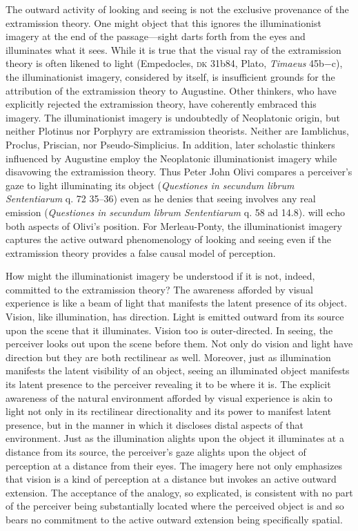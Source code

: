 \documentclass[12pt]{article}
\begin{document}
The outward activity of looking and seeing is not the exclusive provenance of the extramission theory. One might object that this ignores the illuminationist imagery at the end of the passage---sight darts forth from the eyes and illuminates what it sees. While it is true that the visual ray of the extramission theory is often likened to light (Empedocles, \textsc{dk} 31b84, Plato, \emph{Timaeus} 45b−c), the illuminationist imagery, considered by itself, is insufficient grounds for the attribution of the extramission theory to Augustine. Other thinkers, who have explicitly rejected the extramission theory, have coherently embraced this imagery. The illuminationist imagery is undoubtedly of Neoplatonic origin, but neither Plotinus nor Porphyry are extramission theorists. Neither are Iamblichus, Proclus, Priscian, nor Pseudo-Simplicius. In addition, later scholastic thinkers influenced by Augustine employ the Neoplatonic illuminationist imagery while disavowing the extramission theory. Thus Peter John Olivi compares a perceiver's gaze to light illuminating its object (\emph{Questiones in secundum librum Sententiarum} q. 72 35–36) even as he denies that seeing involves any real emission (\emph{Questiones in secundum librum Sententiarum} q. 58 ad 14.8). \citet[185]{Merleau-Ponty:1967fj} will echo both aspects of Olivi's position. For Merleau-Ponty, the illuminationist imagery captures the active outward phenomenology of looking and seeing even if the extramission theory provides a false causal model of perception. 

How might the illuminationist imagery be understood if it is not, indeed, committed to the extramission theory? The awareness afforded by visual experience is like a beam of light that manifests the latent presence of its object. Vision, like illumination, has direction. Light is emitted outward from its source upon the scene that it illuminates. Vision too is outer-directed. In seeing, the perceiver looks out upon the scene before them. Not only do vision and light have direction but they are both rectilinear as well. Moreover, just as illumination manifests the latent visibility of an object, seeing an illuminated object manifests its latent presence to the perceiver revealing it to be where it is. The explicit awareness of the natural environment afforded by visual experience is akin to light not only in its rectilinear directionality and its power to manifest latent presence, but in the manner in which it discloses distal aspects of that environment. Just as the illumination alights upon the object it illuminates at a distance from its source, the perceiver’s gaze alights upon the object of perception at a distance from their eyes. The imagery here not only emphasizes that vision is a kind of perception at a distance but invokes an active outward extension. The acceptance of the analogy, so explicated, is consistent with no part of the perceiver being substantially located where the perceived object is and so bears no commitment to the active outward extension being specifically spatial. 
\end{document}
